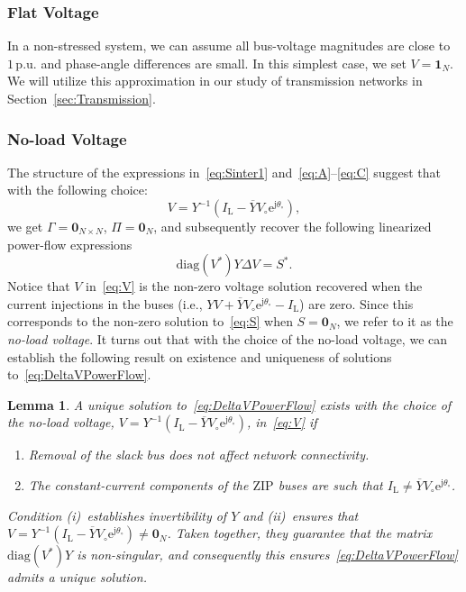 \documentclass[10 pt, conference]{ieeeconf}
\newtheorem{lemma}{Lemma}
\begin{document}
\subsubsection{Flat Voltage} In a non-stressed system, we can assume all bus-voltage magnitudes are close to $1\,\mathrm{p.u.}$ and phase-angle differences are small. In this simplest case, we set $V = \mathbf{1}_N$. We will utilize this approximation in our study of transmission networks in Section~\ref{sec:Transmission}.

\subsubsection{No-load Voltage}
The structure of the expressions in~\eqref{eq:Sinter1} and~\eqref{eq:A}--\eqref{eq:C} suggest that with the following choice: 
\begin{equation} \label{eq:V}
V = Y^{-1}\left(I_\mathrm L - \overline Y V_\circ \mathrm e^{\mathrm j \theta_\circ} \right),
\end{equation}
we get $\Gamma = \mathbf{0}_{N \times N}$, $\Pi = \mathbf{0}_N$, and subsequently recover the following linearized power-flow expressions 
\begin{equation} \label{eq:DeltaVPowerFlow}
\mathrm{diag}\left(V^*\right) Y \Delta V = S^*.
\end{equation}
Notice that $V$ in~\eqref{eq:V} is the non-zero voltage solution recovered when the current injections in the buses (i.e., $YV + \overline Y V_\circ \mathrm{e}^{\mathrm j \theta_\circ} - I_\mathrm{L}$) are zero. Since this corresponds to the non-zero solution to~\eqref{eq:S} when $S = \mathbf{0}_N$, we refer to it as the \emph{no-load voltage}. It turns out that with the choice of the no-load voltage, we can establish the following result on existence and uniqueness of solutions to~\eqref{eq:DeltaVPowerFlow}.

\begin{lemma}
\label{lemma:Yinv}
A unique solution to~\eqref{eq:DeltaVPowerFlow} exists with the choice of the no-load voltage, $V = Y^{-1}\left(I_\mathrm L - \overline Y V_\circ \mathrm e^{\mathrm j \theta_\circ} \right)$, in~\eqref{eq:V} if
\begin{enumerate}
\item[(i)] Removal of the slack bus does not affect network connectivity. 
\item[(ii)] The constant-current components of the $\mathrm{ZIP}$ buses are such that $I_\mathrm L \neq \overline Y V_\circ \mathrm e^{\mathrm j \theta_\circ}$. 
\end{enumerate}
Condition (i)~establishes invertibility of $Y$ and (ii)~ensures that $V =Y^{-1}\left(I_\mathrm L - \overline Y V_\circ \mathrm e^{\mathrm j \theta_\circ} \right) \neq \mathbf{0}_N$. Taken together, they guarantee that the matrix $\mathrm{diag}\left(V^*\right) Y$ is non-singular, and consequently this ensures~\eqref{eq:DeltaVPowerFlow} admits a unique solution.\end{lemma}
\end{document}
